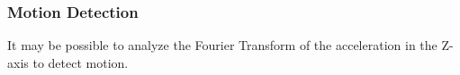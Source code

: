 \documentclass{beamer}
\begin{document}
\begin{frame}
  \frametitle{Motion Detection}
  It may be possible to analyze the Fourier Transform of the
  acceleration in the Z-axis to detect motion.
\end{frame}


\end{document}
